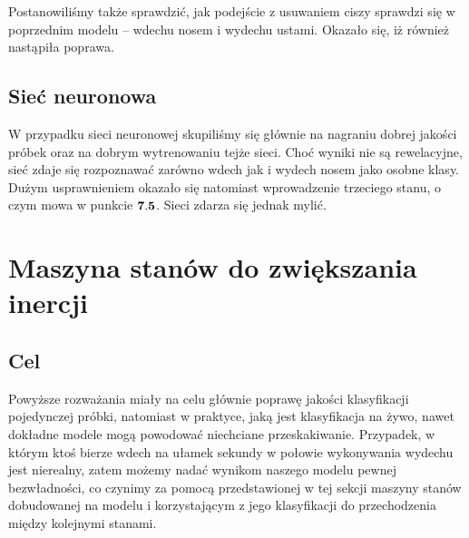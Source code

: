 \documentclass[polish]{article}
\begin{document}
Postanowiliśmy także sprawdzić, jak podejście z usuwaniem ciszy sprawdzi się w poprzednim modelu -- wdechu nosem i wydechu ustami. Okazało się, iż również nastąpiła poprawa.
\subsection{Sieć neuronowa}
W przypadku sieci neuronowej skupiliśmy się głównie na nagraniu dobrej jakości próbek oraz na dobrym wytrenowaniu tejże sieci. Choć wyniki nie są rewelacyjne, sieć zdaje się rozpoznawać zarówno wdech jak i wydech nosem jako osobne klasy. Dużym usprawnieniem okazało się natomiast wprowadzenie trzeciego stanu, o czym mowa w punkcie $\bold{7.5}$. Sieci zdarza się jednak mylić. 

\section{Maszyna stanów do zwiększania inercji}
\subsection{Cel}
Powyższe rozważania miały na celu głównie poprawę jakości klasyfikacji pojedynczej próbki, natomiast w praktyce, jaką jest klasyfikacja na żywo, nawet dokładne modele mogą powodować niechciane przeskakiwanie.
Przypadek, w którym ktoś bierze wdech na ułamek sekundy w połowie wykonywania wydechu jest nierealny, zatem możemy nadać wynikom naszego modelu pewnej bezwładności, co czynimy za pomocą przedstawionej
w tej sekcji maszyny stanów dobudowanej na modelu i korzystającym z jego klasyfikacji do przechodzenia między kolejnymi stanami.
\end{document}
